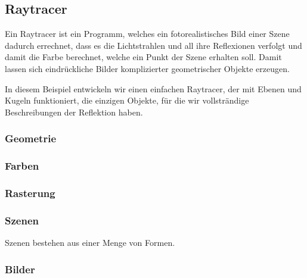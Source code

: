 %
%
\subsection{Raytracer}
Ein Raytracer ist ein Programm, welches ein fotorealistisches Bild
einer Szene dadurch errechnet, dass es die Lichtstrahlen und all ihre
Reflexionen verfolgt und damit die Farbe berechnet, welche ein Punkt
der Szene erhalten soll.
Damit lassen sich eindrückliche Bilder komplizierter
geometrischer Objekte erzeugen.

In diesem Beispiel entwickeln wir einen einfachen Raytracer, der mit
Ebenen und Kugeln funktioniert, die einzigen Objekte, für die wir
vollsträndige Beschreibungen der Reflektion haben.

\subsubsection{Geometrie}


\subsubsection{Farben}

\subsubsection{Rasterung}

\subsubsection{Szenen}
Szenen bestehen aus einer Menge von Formen.

\subsubsection{Bilder}
